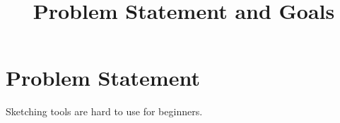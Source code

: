 \documentclass{article}
\title{Problem Statement and Goals\\\progname}
\author{\authname}
\begin{document}
\maketitle
\section{Problem Statement}
Sketching tools are hard to use for beginners.
\end{document}
